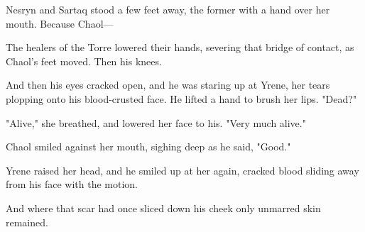 Nesryn and Sartaq stood a few feet away, the former with a hand over her mouth. Because Chaol---

The healers of the Torre lowered their hands, severing that bridge of contact, as Chaol's feet moved. Then his knees.

And then his eyes cracked open, and he was staring up at Yrene, her tears plopping onto his blood-crusted face. He lifted a hand to brush her lips. "Dead?"

"Alive," she breathed, and lowered her face to his. "Very much alive."

Chaol smiled against her mouth, sighing deep as he said, "Good."

Yrene raised her head, and he smiled up at her again, cracked blood sliding away from his face with the motion.

And where that scar had once sliced down his cheek  only unmarred skin remained.

